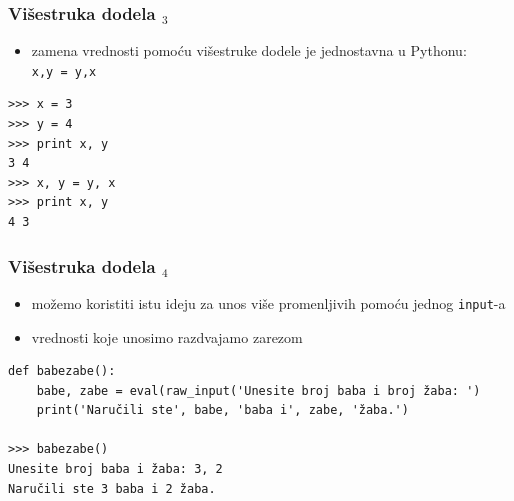 \documentclass[utf8,compress]{beamer}
\begin{document}


\begin{frame}[fragile]
  \frametitle{Višestruka dodela $_3$}
  \begin{itemize}
    \item zamena vrednosti pomoću višestruke dodele je jednostavna u Pythonu: \\
      \texttt{x,y = y,x}
  \end{itemize}
\begin{verbatim}
>>> x = 3
>>> y = 4
>>> print x, y
3 4
>>> x, y = y, x
>>> print x, y
4 3
\end{verbatim}
\end{frame}

\begin{frame}[fragile]
  \frametitle{Višestruka dodela $_4$}
  \begin{itemize}
    \item možemo koristiti istu ideju za unos više promenljivih pomoću jednog \texttt{input}-a
    \item vrednosti koje unosimo razdvajamo zarezom
  \end{itemize}
\begin{verbatim}
def babezabe():
    babe, zabe = eval(raw_input('Unesite broj baba i broj žaba: ')
    print('Naručili ste', babe, 'baba i', zabe, 'žaba.')

>>> babezabe()
Unesite broj baba i žaba: 3, 2
Naručili ste 3 baba i 2 žaba.
\end{verbatim}
\end{frame}
\end{document}
